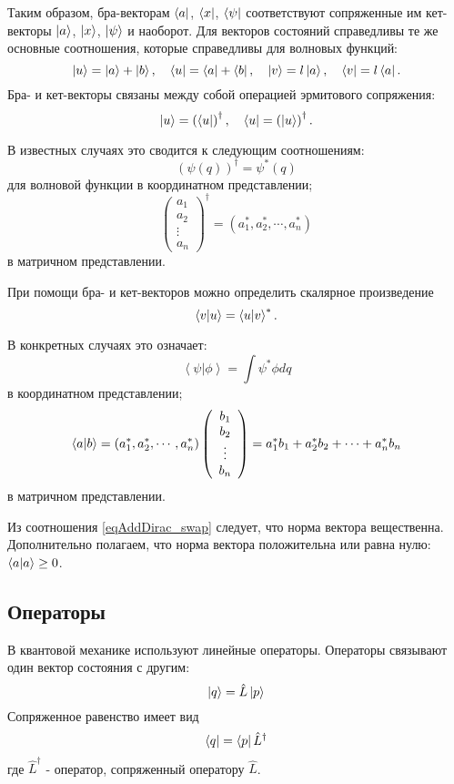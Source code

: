 Таким образом, бра-векторам
$\bra{ a }$,  $\bra{ x }$, $\bra{ \psi }$
соответствуют сопряженные им кет-векторы  
$\ket{ a }$,  $\ket{ x }$, $\ket{ \psi }$
и наоборот. Для векторов состояний справедливы те же основные
соотношения, которые справедливы для волновых функций:  
\begin{equation}
\ket{ u } = \ket{ a }  + \ket{ b }, \quad 
\bra{ u } = \bra{ a }  + \bra{ b }, \quad 
\ket{ v } = l \ket{ a }, \quad  
\bra{ v } = l \bra{ a }.
\end{equation}
Бра- и кет-векторы связаны между собой операцией эрмитового 
сопряжения:
\begin{equation}
\ket{ u } = \left( \bra{ u } \right)^{\dag}, \quad 
\bra{ u } = \left( \ket{ u } \right)^{\dag}.
\end{equation}

В известных случаях это сводится к следующим соотношениям:
\[
\left( \psi\left( q \right) \right)^{\dag} = \psi^{*}\left( q \right)
\]
для волновой функции в координатном представлении;
\[
\left(
\begin{array} {c} 
a_1 \\
a_2 \\
\vdots \\
a_n
\end{array}
 \right)^{\dag} = 
\left( a_1^{*}, a_2^{*}, \cdots, a_n^{*}\right)
\]
в матричном представлении.

При помощи бра- и кет-векторов можно определить скалярное 
произведение
\begin{equation}
\bra{ v }\ket{ u } = \bra{ u }\ket{ v }^{*}.
\label{eqAddDirac_swap}
\end{equation}

В конкретных случаях это означает:
\[
\left< \psi \right|\left. \phi \right> = 
\int \psi^{*} \phi dq
\]
в координатном представлении;
\[
\bra{ a }\ket{ b } = 
\left( a_1^{*}, a_2^{*}, \cdots, a_n^{*}\right) 
\left(
\begin{array} {c} 
b_1 \\
b_2 \\
\vdots \\
b_n
\end{array}
 \right) = 
a_1^{*} b_1 +  a_2^{*} b_2 + \cdots + a_n^{*} b_n
\]
в матричном представлении.

Из соотношения \eqref{eqAddDirac_swap} следует, что норма вектора
вещественна. Дополнительно полагаем, что норма вектора положительна
или равна нулю: 
$\bra{ a }\ket{ a } \geq 0$.

\subsection{Операторы}
В квантовой механике используют линейные операторы. Операторы
связывают один вектор состояния с другим: 
\begin{equation}
\ket{ q } = \hat{L}\ket{ p }
\label{eqAddDirac_operator_property1}
\end{equation}
Сопряженное равенство имеет вид
\begin{equation}
\bra{ q } = \bra{ p }  \hat{L}^{\dag}
\label{eqAddDirac_operator_property2}
\end{equation}
где $\hat{L}^{\dag}$ -  оператор, сопряженный оператору $\hat{L}$.

